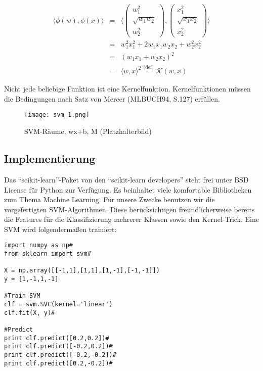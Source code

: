 \begin{eqnarray*}
\langle \phi(w),\phi(x) \rangle & = & \langle \begin{pmatrix}
w_1^2 \\
\sqrt{w_1w_2} \\
w_2^2
\end{pmatrix},
\begin{pmatrix}
x_1^2 \\
\sqrt{x_1x_2} \\
x_2^2
\end{pmatrix} \rangle \\
& = & w_1^2x_1^2 + 2 w_1x_1w_2x_2 + w_2^2x_2^2 \\
& = & (w_1x_1 + w_2x_2)^2 \\
& = & \langle w,x \rangle^2 \overset{\text{(def)}}= \mathcal{K}(w,x)
\end{eqnarray*}

Nicht jede beliebige Funktion ist eine Kernelfunktion. Kernelfunktionen müssen die Bedingungen nach Satz von Mercer (MLBUCH94, S.127) erfüllen.


\begin{figure}[hb]
	\begin{center}
		 \texttt{[image: svm\_1.png]}
	\end{center}
	\caption{SVM-Räume, wx+b, M (Platzhalterbild)}
	\label{fig:svm1}
\end{figure}

\newpage

\subsection{Implementierung}

Das “scikit-learn”-Paket von den “scikit-learn developers” steht frei unter BSD License für Python zur Verfügung. 
Es beinhaltet viele komfortable Bibliotheken zum Thema Machine Learning. 
Für unsere Zwecke benutzen wir die vorgefertigten SVM-Algorithmen. 
Diese berücksichtigen freundlicherweise bereits die Features für die Klassifizierung mehrerer Klassen sowie den Kernel-Trick. Eine SVM wird folgendermaßen trainiert:

\begin{lstlisting}
import numpy as np#
from sklearn import svm#

X = np.array([[-1,1],[1,1],[1,-1],[-1,-1]])
y = [1,-1,1,-1]

#Train SVM
clf = svm.SVC(kernel='linear')
clf.fit(X, y)#

#Predict
print clf.predict([0.2,0.2])#
print clf.predict([-0.2,0.2])#
print clf.predict([-0.2,-0.2])#
print clf.predict([0.2,-0.2])#
\end{lstlisting}


